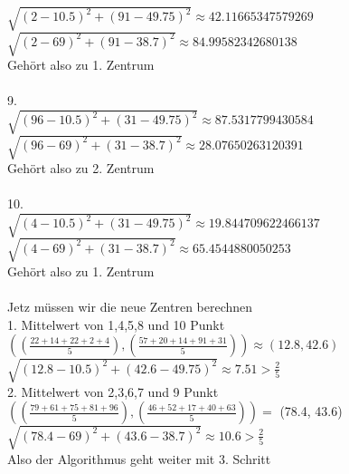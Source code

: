 \begin{enumerate}
$\sqrt{(2-10.5)^2 + (91-49.75)^2} \approx 42.11665347579269$ \\ 
$\sqrt{(2-69)^2 + (91-38.7)^2} \approx 84.99582342680138$ \\ 
Gehört also zu 1. Zentrum \\ \\
9. \\ 
$\sqrt{(96-10.5)^2 + (31-49.75)^2} \approx 87.5317799430584$ \\ 
$\sqrt{(96-69)^2 + (31-38.7)^2} \approx 28.07650263120391$ \\ 
Gehört also zu 2. Zentrum \\ \\
10. \\ 
$\sqrt{(4-10.5)^2 + (31-49.75)^2} \approx 19.844709622466137$ \\ 
$\sqrt{(4-69)^2 + (31-38.7)^2} \approx 65.4544880050253$ \\ 
Gehört also zu 1. Zentrum \\ \\

Jetz müssen wir die neue Zentren berechnen \\
1. Mittelwert von 1,4,5,8 und 10 Punkt
$((\frac{22+14+22+2+4}{5}),(\frac{57+20+14+91+31}{5})) \approx (12.8, 42.6) $ \\
$\sqrt{(12.8-10.5)^2 + (42.6-49.75)^2} \approx 7.51  > \frac{2}{5}$ \\

2. Mittelwert von 2,3,6,7 und 9 Punkt \\
$((\frac{79+61+75+81+96}{5}), (\frac{46+52+17+40+63}{5})) =$ (78.4, 43.6) \\
$\sqrt{(78.4 - 69)^2 + (43.6-38.7)^2} \approx 10.6  > \frac{2}{5}$ \\

Also der Algorithmus geht weiter mit 3. Schritt


\end{enumerate}
